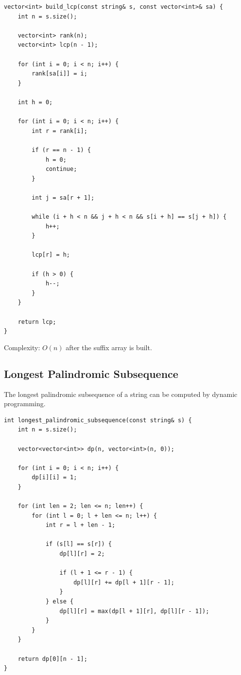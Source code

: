 \documentclass[11pt]{article}
\begin{document}
\begin{lstlisting}
vector<int> build_lcp(const string& s, const vector<int>& sa) {
    int n = s.size();

    vector<int> rank(n);
    vector<int> lcp(n - 1);

    for (int i = 0; i < n; i++) {
        rank[sa[i]] = i;
    }

    int h = 0;

    for (int i = 0; i < n; i++) {
        int r = rank[i];

        if (r == n - 1) {
            h = 0;
            continue;
        }

        int j = sa[r + 1];

        while (i + h < n && j + h < n && s[i + h] == s[j + h]) {
            h++;
        }

        lcp[r] = h;

        if (h > 0) {
            h--;
        }
    }

    return lcp;
}
\end{lstlisting}

Complexity: $O(n)$ after the suffix array is built.

\subsection{Longest Palindromic Subsequence}

The longest palindromic subsequence of a string can be computed by dynamic
programming.

\begin{lstlisting}
int longest_palindromic_subsequence(const string& s) {
    int n = s.size();

    vector<vector<int>> dp(n, vector<int>(n, 0));

    for (int i = 0; i < n; i++) {
        dp[i][i] = 1;
    }

    for (int len = 2; len <= n; len++) {
        for (int l = 0; l + len <= n; l++) {
            int r = l + len - 1;

            if (s[l] == s[r]) {
                dp[l][r] = 2;

                if (l + 1 <= r - 1) {
                    dp[l][r] += dp[l + 1][r - 1];
                }
            } else {
                dp[l][r] = max(dp[l + 1][r], dp[l][r - 1]);
            }
        }
    }

    return dp[0][n - 1];
}
\end{lstlisting}
\end{document}
